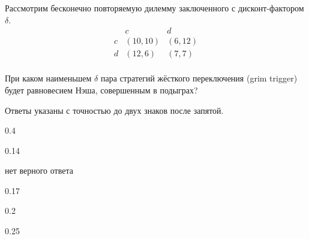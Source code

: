 
\begin{question}
Рассмотрим бесконечно повторяемую дилемму заключенного с
дисконт-фактором \(\delta\). \[
\begin{matrix}
   & c & d \\
c  & (10, 10) & (6, 12) \\
d  & (12, 6) & (7, 7) \\
\end{matrix}
\]

При каком наименьшем \(\delta\) пара стратегий жёсткого переключения
(grim trigger) будет равновесием Нэша, совершенным в подыграх?

Ответы указаны с точностью до двух знаков после запятой.
\begin{answerlist}
  \item 0.4
  \item 0.14
  \item нет верного ответа
  \item 0.17
  \item 0.2
  \item 0.25
\end{answerlist}
\end{question}


